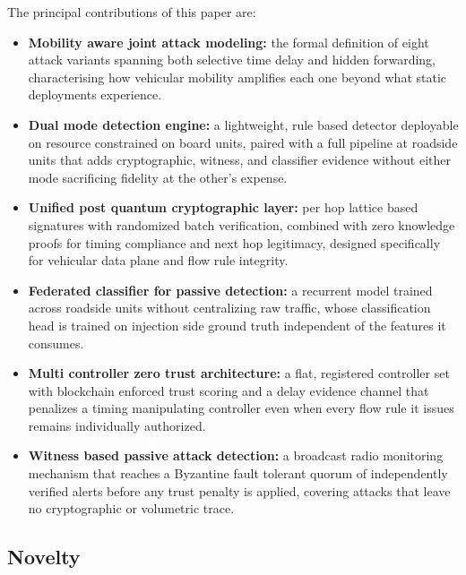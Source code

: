 \documentclass[lettersize,journal]{IEEEtran}
\theoremstyle{plain}
\theoremstyle{remark}
\begin{document}
	The principal contributions of this paper are:
	\begin{itemize}
		\item \textbf{Mobility aware joint attack modeling:} the formal
		definition of eight attack variants spanning both selective time
		delay and hidden forwarding, characterising how vehicular mobility
		amplifies each one beyond what static deployments experience.
		\item \textbf{Dual mode detection engine:} a lightweight, rule based
		detector deployable on resource constrained on board units, paired
		with a full pipeline at roadside units that adds cryptographic,
		witness, and classifier evidence without either mode sacrificing
		fidelity at the other's expense.
		\item \textbf{Unified post quantum cryptographic layer:} per hop
		lattice based signatures with randomized batch verification,
		combined with zero knowledge proofs for timing compliance and next
		hop legitimacy, designed specifically for vehicular data plane and
		flow rule integrity.
		\item \textbf{Federated classifier for passive detection:} a
		recurrent model trained across roadside units without centralizing
		raw traffic, whose classification head is trained on injection side
		ground truth independent of the features it consumes.
		\item \textbf{Multi controller zero trust architecture:} a flat,
		registered controller set with blockchain enforced trust scoring and
		a delay evidence channel that penalizes a timing manipulating
		controller even when every flow rule it issues remains individually
		authorized.
		\item \textbf{Witness based passive attack detection:} a broadcast
		radio monitoring mechanism that reaches a Byzantine fault tolerant
		quorum of independently verified alerts before any trust penalty is
		applied, covering attacks that leave no cryptographic or volumetric
		trace.
	\end{itemize}
	
	\subsection{Novelty}\label{subsec:novelty}
	
\end{document}
